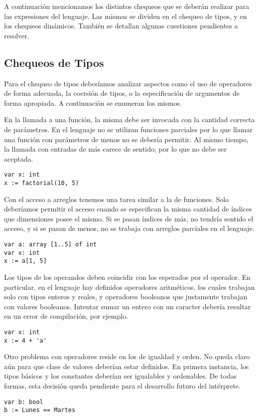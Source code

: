 \documentclass{article}
\begin{document}
A continuación mencionamos los distintos chequeos que se deberán realizar para las expresiones del lenguaje.
Las mismas se dividen en el chequeo de tipos, y en los chequeos dinámicos.
También se detallan algunas cuestiones pendientes a resolver.

\subsection{Chequeos de Tipos}

Para el chequeo de tipos deberíamos analizar aspectos como el uso de operadores de forma adecuada, la coersión de tipos, o la especificación de argumentos de forma apropiada.
A continuación se enumeran los mismos.

En la llamada a una función, la misma debe ser invocada con la cantidad correcta de parámetros.
En el lenguaje no se utilizan funciones parciales por lo que llamar una función con parámetros de menos no se debería permitir.
Al mismo tiempo, la llamada con entradas de más carece de sentido, por lo que no debe ser aceptada.
\begin{lstlisting}
var x: int
x := factorial(10, 5)
\end{lstlisting}

Con el acceso a arreglos tenemos una tarea similar a la de funciones.
Solo deberíamos permitir el acceso cuando se especifican la misma cantidad de índices que dimensiones posee el mismo.
Si se pasan índices de más, no tendría sentido el acceso, y si se pasan de menos, no se trabaja con arreglos parciales en el lenguaje.
\begin{lstlisting}
var a: array [1..5] of int
var x: int
x := a[1, 5]
\end{lstlisting}

Los tipos de los operandos deben coincidir con los esperados por el operador.
En particular, en el lenguaje hay definidos operadores aritméticos, los cuales trabajan solo con tipos enteros y reales, y operadores booleanos que justamente trabajan con valores booleanos.
Intentar sumar un entero con un caracter debería resultar en un error de compilación, por ejemplo.
\begin{lstlisting}
var x: int
x := 4 + 'a'
\end{lstlisting}

Otro problema con operadores reside en los de igualdad y orden.
No queda claro aún para que clase de valores deberían estar definidos.
En primera instancia, los tipos básicos y los constantes deberían ser igualables y ordenables.
De todas formas, esta decisión queda pendiente para el desarrollo futuro del intérprete.
\begin{lstlisting}
var b: bool
b := Lunes == Martes
\end{lstlisting}
\end{document}

